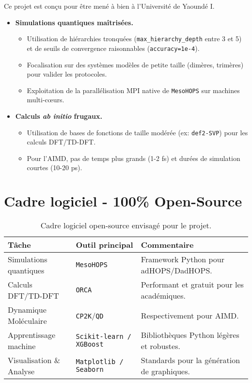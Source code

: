 \documentclass[12pt, a4paper]{article}
\begin{document}
Ce projet est conçu pour être mené à bien à l'Université de Yaoundé I.
\begin{itemize}
    \item \textbf{Simulations quantiques maîtrisées.}
        \begin{itemize}
            \item Utilisation de hiérarchies tronquées (\texttt{max\_hierarchy\_depth} entre 3 et 5) et de seuils de convergence raisonnables (\texttt{accuracy=1e-4}).

            \item Focalisation sur des systèmes modèles de petite taille (dimères, trimères) pour valider les protocoles.

            \item Exploitation de la parallélisation MPI native de \texttt{MesoHOPS} sur machines multi-cœurs.
        \end{itemize}

    \item \textbf{Calculs \textit{ab initio} frugaux.}
        \begin{itemize}
            \item Utilisation de bases de fonctions de taille modérée (ex: \texttt{def2-SVP}) pour les calculs DFT/TD-DFT.

            \item Pour l'AIMD, pas de temps plus grands (1-2 fs) et durées de simulation courtes (10-20 ps).
        \end{itemize}
\end{itemize}


\section{Cadre logiciel - 100\% Open-Source}

\begin{table}[htp]
    \centering
    \caption{Cadre logiciel open-source envisagé pour le projet.}
    \label{tab:software}
    \begin{tabular}{@{}lll@{}}
        \toprule
        \textbf{Tâche} & \textbf{Outil principal} & \textbf{Commentaire} \\ \midrule
        Simulations quantiques & \texttt{MesoHOPS}\footnotemark & Framework Python pour adHOPS/DadHOPS. \\
        Calculs DFT/TD-DFT & \texttt{ORCA} & Performant et gratuit pour les académiques. \\
        Dynamique Moléculaire & \texttt{CP2K}/\texttt{QD} & Respectivement pour AIMD. \\
        Apprentissage machine & \texttt{Scikit-learn / XGBoost} & Bibliothèques Python légères et robustes. \\
        Visualisation \& Analyse & \texttt{Matplotlib / Seaborn} & Standards pour la génération de graphiques. \\ \bottomrule
    \end{tabular}
\end{table}
\end{document}
